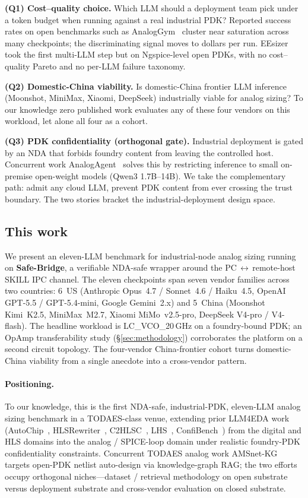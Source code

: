 \textbf{(Q1) Cost--quality choice.} Which LLM should a deployment
team pick under a token budget when running against a real
industrial PDK? Reported success rates on open benchmarks such as
AnalogGym~\cite{analoggym} cluster near saturation across many
checkpoints; the discriminating signal moves to dollars per run.
EEsizer~\cite{eesizer} took the first multi-LLM step but on
Ngspice-level open PDKs, with no cost--quality Pareto and no
per-LLM failure taxonomy.

\textbf{(Q2) Domestic-China viability.} Is domestic-China frontier
LLM inference (Moonshot, MiniMax, Xiaomi, DeepSeek) industrially
viable for analog sizing? To our knowledge zero published work
evaluates any of these four vendors on this workload, let alone all
four as a cohort.

\textbf{(Q3) PDK confidentiality (orthogonal gate).} Industrial
deployment is gated by an NDA that forbids foundry content from
leaving the controlled host. Concurrent work
AnalogAgent~\cite{analogagent} solves this by restricting inference
to small on-premise open-weight models (Qwen3 1.7B--14B). We take
the complementary path: admit any cloud LLM, prevent PDK content
from ever crossing the trust boundary. The two stories bracket the
industrial-deployment design space.

\subsection{This work}
\label{sec:intro-thiswork}

We present an eleven-LLM benchmark for industrial-node analog
sizing running on \textbf{Safe-Bridge}, a verifiable NDA-safe
wrapper around the PC\,$\leftrightarrow$\,remote-host SKILL IPC
channel. The eleven checkpoints span seven vendor families across
two countries: 6~US (Anthropic Opus~4.7 / Sonnet~4.6 / Haiku~4.5,
OpenAI GPT-5.5 / GPT-5.4-mini, Google Gemini~2.x) and 5~China
(Moonshot Kimi~K2.5, MiniMax~M2.7, Xiaomi MiMo~v2.5-pro, DeepSeek
V4-pro / V4-flash). The headline workload is LC\_VCO\_20\,GHz on a
foundry-bound PDK; an OpAmp transferability study (\S\ref{sec:methodology})
corroborates the platform on a second circuit topology. The
four-vendor China-frontier cohort turns domestic-China viability
from a single anecdote into a cross-vendor pattern.

\paragraph{Positioning.}
To our knowledge, this is the first NDA-safe, industrial-PDK,
eleven-LLM analog sizing benchmark in a TODAES-class venue,
extending prior LLM4EDA work (AutoChip~\cite{autochip},
HLSRewriter~\cite{hlsrewriter}, C2HLSC~\cite{c2hlsc},
LHS~\cite{lhs}, ConfiBench~\cite{confibench}) from the digital and
HLS domains into the analog / SPICE-loop domain under realistic
foundry-PDK confidentiality constraints. Concurrent TODAES analog
work AMSnet-KG~\cite{amsnetkg} targets open-PDK netlist
auto-design via knowledge-graph RAG; the two efforts occupy
orthogonal niches---dataset / retrieval methodology on open
substrate versus deployment substrate and cross-vendor evaluation
on closed substrate.

